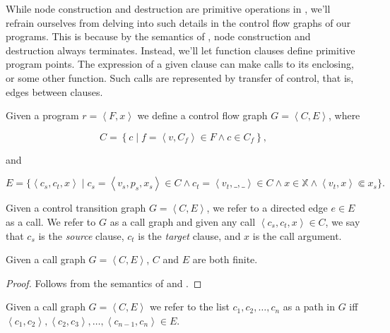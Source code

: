 While node construction and destruction are primitive operations in \D{}, we'll
refrain ourselves from delving into such details in the control flow graphs of
our programs. This is because by the semantics of \D{}, node construction and
destruction always terminates. Instead, we'll let function clauses define
primitive program points. The expression of a given clause can make calls to
its enclosing, or some other function. Such calls are represented by transfer
of control, that is, edges between clauses.

\begin{definition}\label{definition:size-change-first-graph} Given a program
$r=\left\langle F,x \right\rangle$ we define a control flow graph $G =
\left\langle C, E \right\rangle$, where

$$C= \left\{ c \mid f= \left\langle v,C_f \right\rangle \in F \wedge c\in C_f
\right\},$$

and

$$E=\{ \left\langle c_s,c_t,x\right\rangle \mid c_s = \left\langle v_s, p_s,
x_s \right\rangle \in C \wedge c_t = \left\langle v_t, \_, \_ \right\rangle \in
C \wedge x\in\mathbb{X} \wedge \left\langle v_t, x \right\rangle \Subset x_s\}
.$$

\end{definition}

\begin{definition} Given a control transition graph $G= \left\langle C,E
\right\rangle$, we refer to a directed edge $e\in E$ as a call. We refer to $G$
as a call graph and given any call $\left\langle c_s,c_t,x \right\rangle \in
C$, we say that $c_s$ is the \emph{source} clause, $c_t$ is the \emph{target}
clause, and $x$ is the call argument.  \end{definition}

\begin{lemma}\label{lemma:first-call-graph-finite} Given a call graph $G=
\left\langle C,E \right\rangle$, $C$ and $E$ are both finite.\end{lemma}

\begin{proof} Follows from the semantics of \D{} and
.\end{proof}

\begin{definition} Given a call graph $G = \left\langle C,E \right\rangle$ we
refer to the list $c_1,c_2,\ldots,c_n$ as a path in $G$ iff\\ $\left\langle
c_1,c_2 \right\rangle, \left\langle c_2,c_3 \right\rangle, \ldots,\left\langle
c_{n-1}, c_n \right\rangle \in E$.\end{definition}

